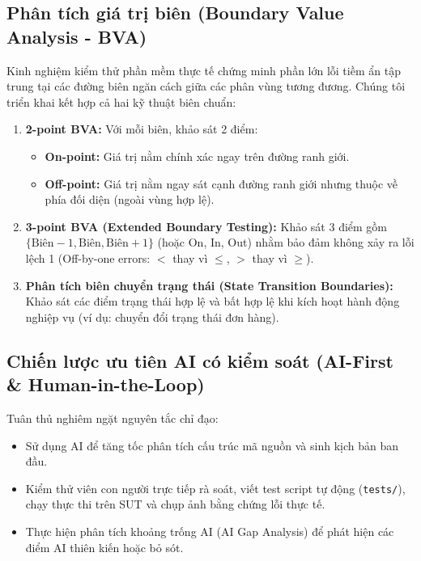 \documentclass[11pt,a4paper]{article}
\begin{document}
\subsection{Phân tích giá trị biên (Boundary Value Analysis - BVA)}
Kinh nghiệm kiểm thử phần mềm thực tế chứng minh phần lớn lỗi tiềm ẩn tập trung tại các đường biên ngăn cách giữa các phân vùng tương đương. Chúng tôi triển khai kết hợp cả hai kỹ thuật biên chuẩn:
\begin{enumerate}
    \item \textbf{2-point BVA:} Với mỗi biên, khảo sát 2 điểm:
    \begin{itemize}
        \item \textbf{On-point:} Giá trị nằm chính xác ngay trên đường ranh giới.
        \item \textbf{Off-point:} Giá trị nằm ngay sát cạnh đường ranh giới nhưng thuộc về phía đối diện (ngoài vùng hợp lệ).
    \end{itemize}
    \item \textbf{3-point BVA (Extended Boundary Testing):} Khảo sát 3 điểm gồm $\{\text{Biên} - 1, \text{Biên}, \text{Biên} + 1\}$ (hoặc On, In, Out) nhằm bảo đảm không xảy ra lỗi lệch 1 (Off-by-one errors: $<$ thay vì $\le$, $>$ thay vì $\ge$).
    \item \textbf{Phân tích biên chuyển trạng thái (State Transition Boundaries):} Khảo sát các điểm trạng thái hợp lệ và bất hợp lệ khi kích hoạt hành động nghiệp vụ (ví dụ: chuyển đổi trạng thái đơn hàng).
\end{enumerate}

\subsection{Chiến lược ưu tiên AI có kiểm soát (AI-First \& Human-in-the-Loop)}
Tuân thủ nghiêm ngặt nguyên tắc chỉ đạo:
\begin{itemize}
    \item Sử dụng AI để tăng tốc phân tích cấu trúc mã nguồn và sinh kịch bản ban đầu.
    \item Kiểm thử viên con người trực tiếp rà soát, viết test script tự động (\texttt{tests/}), chạy thực thi trên SUT và chụp ảnh bằng chứng lỗi thực tế.
    \item Thực hiện phân tích khoảng trống AI (AI Gap Analysis) để phát hiện các điểm AI thiên kiến hoặc bỏ sót.
\end{itemize}

\newpage

\end{document}

